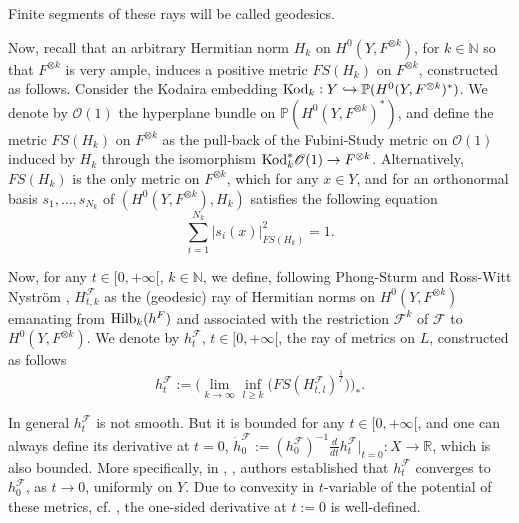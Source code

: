 \documentclass[12pt]{article}
\numberwithin{equation}{section}
\theoremstyle{theorem}
\theoremstyle{definition}
\theoremstyle{remark}
\newcommand{\real}{\mathbb{R}}
\newcommand{\nat}{\mathbb{N}}
\begin{document}
	Finite segments of these rays will be called geodesics.
	\par 
	Now, recall that an arbitrary Hermitian norm $H_k$ on $H^0(Y, F^{\otimes k})$, for $k \in \nat$ so that $F^{\otimes k}$ is very ample, induces a positive metric $FS(H_k)$ on $F^{\otimes k}$, constructed as follows.
	Consider the Kodaira embedding ${\rm{Kod}}_k : Y \hookrightarrow \mathbb{P}(H^0(Y, F^{\otimes k})^*)$.
	We denote by $\mathscr{O}(1)$ the hyperplane bundle on $\mathbb{P}(H^0(Y, F^{\otimes k})^*)$, and define the metric $FS(H_k)$ on $F^{\otimes k}$ as the pull-back of the Fubini-Study metric on $\mathscr{O}(1)$ induced by $H_k$ through the isomorphism ${\rm{Kod}}_k^* \mathscr{O}(1) \to F^{\otimes k}$.
	Alternatively, $FS(H_k)$ is the only metric on $F^{\otimes k}$, which for any $x \in Y$, and for an orthonormal basis $s_1, \ldots, s_{N_k}$ of $(H^0(Y, F^{\otimes k}), H_k)$ satisfies the following equation
	\begin{equation}\label{eq_fs_alt_defn}
		\sum_{i = 1}^{N_k} \big| s_i(x) \big|^2_{FS(H_k)} = 1.
	\end{equation}
	\par 
	Now, for any $t \in [0, +\infty[$, $k \in \nat$, we define, following Phong-Sturm \cite{PhongSturmDirMA} and Ross-Witt Nystr{\"o}m \cite{RossNystAnalTConf}, $H^{\mathcal{F}}_{t, k}$ as the (geodesic) ray of Hermitian norms on $H^0(Y, F^{\otimes k})$ emanating from ${\rm{Hilb}}_k(h^F)$ and associated with the restriction $\mathcal{F}^k$ of $\mathcal{F}$ to $H^0(Y, F^{\otimes k})$.
	We denote by $h^{\mathcal{F}}_t$, $t \in [0, +\infty[$, the ray of metrics on $L$, constructed as follows
	\begin{equation}\label{eq_geod_ray_filt}
		h^{\mathcal{F}}_t := \Big( \lim_{k \to \infty} \inf_{l \geq k} \big( FS(H^{\mathcal{F}}_{t, l})^{\frac{1}{l}} \big) \Big)_{*}.
	\end{equation}
	\par 
	In general $h^{\mathcal{F}}_t$ is not smooth. But it is bounded for any $t \in [0, + \infty[$, and one can always define its derivative at $t = 0$, $\dot{h}^{\mathcal{F}}_0 := (h^{\mathcal{F}}_0)^{-1} \frac{d}{dt} h^{\mathcal{F}}_t|_{t = 0}: X \to \real$, which is also bounded.
	More specifically, in \cite[\S 2.2]{BernBrunnMink}, \cite[Theorem 9.2]{RossNystAnalTConf}, authors established that $h^{\mathcal{F}}_t$ converges to $h^{\mathcal{F}}_0$, as $t \to 0$, uniformly on $Y$. 
	Due to convexity in $t$-variable of the potential of these metrics, cf. \cite[Theorem I.5.13]{DemCompl}, the one-sided derivative at $t := 0$ is well-defined.
\end{document}
